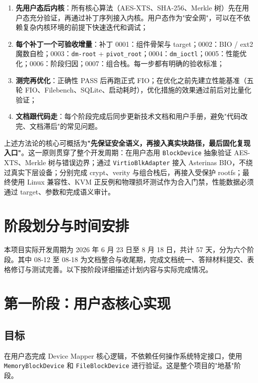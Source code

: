 \begin{enumerate}
    \item \textbf{先用户态后内核}：所有核心算法（AES-XTS、SHA-256、Merkle 树）先在用户态充分验证，再通过补丁序列接入内核。用户态作为"安全网"，可以在不依赖复杂内核环境的前提下快速迭代和调试；
    \item \textbf{每个补丁一个可验收增量}：补丁 0001：组件骨架与 target；0002：BIO / ext2 魔数自检；0003：\texttt{dm-root} + \texttt{pivot\_root}；0004：\texttt{dm\_ioctl}；0005：性能优化；0006：阶段归因；0007：组合栈。每一步都有明确的验收标准；
    \item \textbf{测完再优化}：正确性 PASS 后再跑正式 FIO；在优化之前先建立性能基准（五轮 FIO、Filebench、SQLite、启动耗时），优化措施的效果通过前后对比量化验证；
    \item \textbf{文档跟代码走}：每个阶段完成后同步更新技术文档和用户手册，避免"代码改完、文档滞后"的常见问题。
\end{enumerate}

上述方法论的核心可概括为\textbf{"先保证安全语义，再接入真实块路径，最后固化复现入口"}。这一原则贯穿了整个开发周期：在用户态用 \texttt{BlockDevice} 抽象验证 AES-XTS、Merkle 树与错误边界；通过 \texttt{VirtioBlkAdapter} 接入 Asterinas BIO，不绕过真实下层设备；分别完成 crypt、verity 与组合栈后，再接入受保护 rootfs；最终使用 Linux 兼容性、KVM 正反例和物理损坏测试作为合入门禁，性能数据必须通过 target、参数和完成语义审计。

\section{阶段划分与时间安排}

本项目实际开发周期为 2026 年 6 月 23 日至 8 月 18 日，共计 57 天，分为六个阶段。其中 08-12 至 08-18 为文档整合与收尾期，完成文档统一、答辩材料提交、表格修订与测试完善。以下按阶段详细描述计划内容与实际完成情况。

\section{第一阶段：用户态核心实现}

\subsection{目标}
在用户态完成 Device Mapper 核心逻辑，不依赖任何操作系统特定接口，使用 \texttt{MemoryBlockDevice} 和 \texttt{FileBlockDevice} 进行验证。这是整个项目的"地基"阶段。

